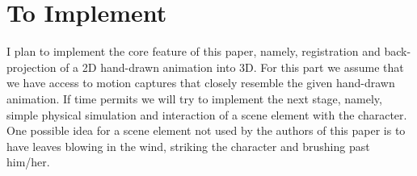 \documentclass[a4paper,9pt]{article}
\begin{document}
\section{To Implement}

I plan to implement the core feature of this paper, namely, registration and back-projection of a 2D hand-drawn animation into 3D. For this part we assume that we have access to motion captures that closely resemble the given hand-drawn animation. If time permits we will try to implement the next stage, namely, simple physical simulation and interaction of a scene element with the character. One possible idea for a scene element not used by the authors of this paper is to have leaves blowing in the wind, striking the character and brushing past him/her.

{}

\end{document}
